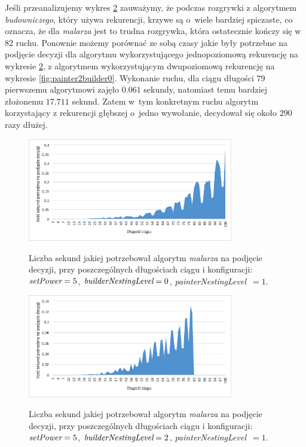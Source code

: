 \documentclass[document]{xmgr}
\begin{document}
Jeśli przeanalizujemy wykres \ref{fig:painter1builder2} zauważymy, że podczas rozgrywki z algorytmem \emph{budowniczego}, który używa rekurencji, krzywe są o~wiele bardziej spiczaste, co oznacza, że dla \emph{malarza} jest to trudna rozgrywka, która ostatecznie kończy się w~$82$ ruchu. Ponownie możemy porównać ze sobą czasy jakie były potrzebne na podjęcie decyzji dla algorytmu wykorzystującego jednopoziomową rekurencję na wykresie \ref{fig:painter1builder2}, z algorytmem wykorzystującym dwupoziomową rekurencję na wykresie \ref{fig:painter2builder0}. Wykonanie ruchu, dla ciągu długości $79$ pierwszemu algorytmowi zajęło $0.061$ sekundy, natomiast temu bardziej złożonemu $17.711$ sekund. Zatem w~tym konkretnym ruchu algorytm korzystający z rekurencji głębszej o~jedno wywołanie, decydował się około $290$ razy dłużej.

\begin{figure}[tbh]
    \centering
    \caption{Liczba sekund jakiej potrzebował algorytm \emph{malarza} na podjęcie decyzji, przy poszczególnych długościach ciągu i konfiguracji: $\emph{setPower}=5$, $\emph{builderNestingLevel}=0$, \emph{painterNestingLevel}~$=1$.}
    \includegraphics[width = 0.8\textwidth]{images2/timePainter1Builder0}
    \label{fig:painter1builder0}
\end{figure}

\begin{figure}[tbh]
    \centering
    \caption{Liczba sekund jakiej potrzebował algorytm \emph{malarza} na podjęcie decyzji, przy poszczególnych długościach ciągu i konfiguracji: $\emph{setPower}=5$, $\emph{builderNestingLevel}=2$, \emph{painterNestingLevel}~$=1$.}
    \includegraphics[width = 0.8\textwidth]{images2/timePainter1Builder2}
    \label{fig:painter1builder2}
\end{figure}
\end{document}
